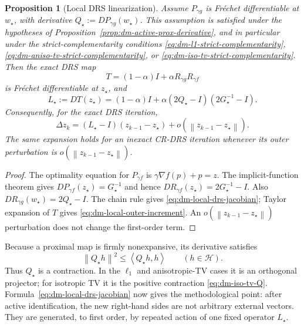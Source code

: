 \documentclass[10pt,leqno]{amsart}
\numberwithin{equation}{section}
\numberwithin{algorithm}{section}
\newtheorem{proposition}[theorem]{Proposition}
\theoremstyle{remark}
\newcommand{\Hcal}{\mathcal{H}}
\newcommand{\norm}[1]{\left\lVert #1 \right\rVert}
\newcommand{\ip}[2]{\left\langle #1,#2 \right\rangle}
\newcommand{\grad}{\nabla}
\begin{document}
\begin{proposition}[Local DRS linearization]
\label{prop:dm-local-drs-jacobian}
Assume \(P_{\gamma g}\) is Fr\'echet differentiable at \(w_\star\), with derivative
\(Q_\star:=DP_{\gamma g}(w_\star)\).  This assumption is satisfied under the hypotheses of Proposition~\ref{prop:dm-active-prox-derivative}, and in particular under the strict-complementarity conditions \eqref{eq:dm-l1-strict-complementarity}, \eqref{eq:dm-aniso-tv-strict-complementarity}, or \eqref{eq:dm-iso-tv-strict-complementarity}.  Then the exact DRS map
\[
    T=(1-\alpha)I+\alpha R_{\gamma g}R_{\gamma f}
\]
is Fr\'echet differentiable at \(z_\star\), and
\begin{equation}
\label{eq:dm-local-drs-jacobian}
    L_\star:=DT(z_\star)
    =(1-\alpha)I
      +\alpha(2Q_\star-I)(2G_\star^{-1}-I).
\end{equation}
Consequently, for the exact DRS iteration,
\begin{equation}
\label{eq:dm-local-outer-increment}
    \Delta z_k
    =(L_\star-I)(z_{k-1}-z_\star)
      +o(\norm{z_{k-1}-z_\star}).
\end{equation}
The same expansion holds for an inexact CR-DRS iteration whenever its outer perturbation is \(o(\norm{z_{k-1}-z_\star})\).
\end{proposition}

\begin{proof}
The optimality equation for \(P_{\gamma f}\) is
\(\gamma\grad f(p)+p=z\).  The implicit-function theorem gives
\(DP_{\gamma f}(z_\star)=G_\star^{-1}\) and hence
\(DR_{\gamma f}(z_\star)=2G_\star^{-1}-I\).  Also
\(DR_{\gamma g}(w_\star)=2Q_\star-I\).  The chain rule gives
\eqref{eq:dm-local-drs-jacobian}; Taylor expansion of \(T\) gives
\eqref{eq:dm-local-outer-increment}.  An \(o(\norm{z_{k-1}-z_\star})\) perturbation does not change the first-order term.
\end{proof}

Because a proximal map is firmly nonexpansive, its derivative satisfies
\begin{equation}
\label{eq:dm-Q-firm}
    \norm{Q_\star h}^2\le\ip{Q_\star h}{h}
    \qquad(h\in\Hcal).
\end{equation}
Thus \(Q_\star\) is a contraction.  In the \(\ell_1\) and anisotropic-TV cases it is an orthogonal projector; for isotropic TV it is the positive contraction \eqref{eq:dm-iso-tv-Q}.  Formula~\eqref{eq:dm-local-drs-jacobian} now gives the methodological point: after active identification, the new right-hand sides are not arbitrary external vectors.  They are generated, to first order, by repeated action of one fixed operator \(L_\star\).
\end{document}
